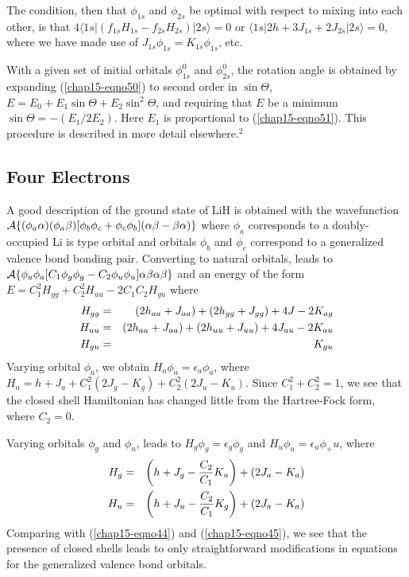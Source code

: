 The condition, then that $\phi_{1s}$ and $\phi_{2s}$ be optimal with 
respect to mixing into each other, is that $4 \langle 1s | ( f_{1s} 
H_{1s} - f_{2s} H_{2s} )|2s \rangle =0$ or $\langle 1s | 2h + 
3J_{1s} + 2J_{2s}|2s \rangle =0$, where we have made use of $J_{1s} 
\phi_{1s} = K_{1s} \phi_{1s}$, etc.

With a given set of initial orbitals $\phi^0_{1s}$ and $\phi^0_{2s}$,
the rotation angle is obtained by expanding (\ref{chap15-eqno50}) to
second order in $\sin
\Theta$, $E = E_0 + E_1 \sin \Theta + E_2 \sin^2 \Theta$,
and requiring that $E$ be a minimum $\sin \Theta = - (E_1 / 2E_2)$.
Here $E_1$ is proportional to (\ref{chap15-eqno51}).  This procedure
is described in more detail elsewhere.$^2$

\subsection{Four Electrons}

A good description of the ground state of LiH is obtained with the
wavefunction ${\cal A} \{ ( \phi_a \alpha ) ( \phi_a \beta )[\phi_b 
\phi_c + \phi_c \phi_b](\alpha \beta - \beta \alpha)\}$ where $\phi_a$
corresponds to a doubly-occupied Li is type orbital and orbitals 
$\phi_b$ and $\phi_c$ correspond to a generalized valence bond bonding 
pair.  Converting to natural orbitals, leads to ${\cal A} \{\phi_a 
\phi_a [ C_1 \phi_g \phi_g - C_2 \phi_u \phi_u] \alpha \beta \alpha 
\beta\}$ and an energy of the form $E = C_1^2 H_{gg} + C^2_2 H_{uu} - 
2C_1 C_2 H_{gu}$ where
\begin{eqnarray}
H_{gg} &=& (2 h_{aa} + J_{aa}) + (2 h_{gg} + J_{gg}) + 4J - 2K_{ag}\cr
H_{uu} &=& (2h_{aa} + J_{aa}) + (2h_{uu} + J_{uu}) + 4J_{au} - 
2K_{au}\cr
H_{gu} &=& K_{gu}
\label{chap15-eqno52}
\end{eqnarray}
Varying orbital $\phi_a$, we obtain $H_a \phi_a = \epsilon_a \phi_a$, where
$H_a = h+ J_a + C^2_1 (2J_g - K_g) + C^2_2 (2J_u - K_u)$.   Since 
$C^2_1 + C^2_2 = 1$, we see that the closed shell Hamiltonian has changed
little from the Hartree-Fock form, where $C_2 = 0$.

Varying orbitals $\phi_g$ and $\phi_u$, leads to $H_g \phi_g = 
\epsilon_g \phi_g$ and $H_u \phi_u = \epsilon_u \phi_+u$, where
\begin{eqnarray}
H_g &=& \left( h + J_g - {C_2 \over C_1} K_u \right) + \left( 2 J_a - 
K_a \right)\cr
H_u &=& \left( h + J_u - {C_2 \over C_1} K_g \right) + \left( 2 J_a - 
K_a \right)
\end{eqnarray}
Comparing with (\ref{chap15-eqno44}) and (\ref{chap15-eqno45}), we see
that the presence of closed shells leads to only straightforward
modifications in equations for the generalized valence bond orbitals.

